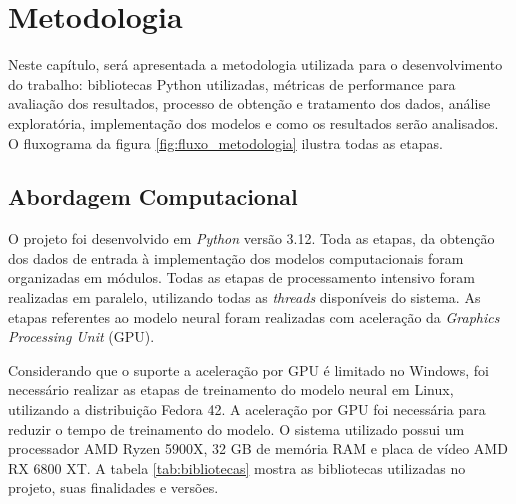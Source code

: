 \chapter{Metodologia} %
Neste capítulo, será apresentada a metodologia utilizada para o desenvolvimento do trabalho: bibliotecas Python utilizadas, métricas 
de performance para avaliação dos resultados, processo de obtenção e tratamento dos dados, análise exploratória, implementação
dos modelos e como os resultados serão analisados. O fluxograma da figura \ref{fig:fluxo_metodologia} ilustra todas as etapas.

\begin{figure}[!ht]
	{}
	{}
\end{figure}

\section{Abordagem Computacional} %

O projeto foi desenvolvido em \textit{Python} versão 3.12. Toda as etapas, da obtenção dos dados de entrada à implementação
dos modelos computacionais foram organizadas em módulos. Todas as etapas de processamento intensivo foram realizadas em
paralelo, utilizando todas as \textit{threads} disponíveis do sistema. As etapas referentes ao modelo neural foram 
realizadas com aceleração da \textit{Graphics Processing Unit} (GPU).

Considerando que o suporte a aceleração por GPU é limitado no Windows, foi necessário realizar as etapas de treinamento do modelo 
neural em Linux, utilizando a distribuição Fedora 42. A aceleração por GPU foi necessária para reduzir o tempo de treinamento do modelo. 
O sistema utilizado possui um processador AMD Ryzen 5900X, 32 GB de memória RAM e placa de vídeo AMD RX 6800 XT. A tabela 
\ref{tab:bibliotecas} mostra as bibliotecas utilizadas no projeto, suas finalidades e versões.

